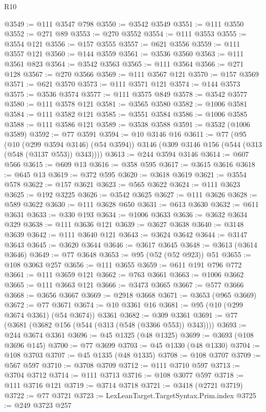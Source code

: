 \begin{lexlean}{R10}
\begin{coremodule}
{{{{{{{{{{{{{{{{{{{{{{{{{{{{{{{{{{{{{{{{{{{{{{{{{{{{{{{{{{{{{{{{{{{{{{{{{{{{{{{{{{{{{{{{{{{{{{{{{{{{{{{{{{{{@3549 := @111 @3547 @798
@3550 := @3542 @3549
@3551 := @111 @3550
@3552 := @271 @89
@3553 := @270 @3552
@3554 := @111 @3553
@3555 := @3554 @121
@3556 := @157 @3555
@3557 := @621 @3556
@3559 := @111 @3557 @121
@3560 := @144 @3559
@3561 := @3536 @3560
@3563 := @111 @3561 @823
@3564 := @3542 @3563
@3565 := @111 @3564
@3566 := @271 @128
@3567 := @270 @3566
@3569 := @111 @3567 @121
@3570 := @157 @3569
@3571 := @621 @3570
@3573 := @111 @3571 @121
@3574 := @144 @3573
@3575 := @3536 @3574
@3577 := @111 @3575 @849
@3578 := @3542 @3577
@3580 := @111 @3578 @121
@3581 := @3565 @3580
@3582 := @1006 @3581
@3584 := @111 @3582 @121
@3585 := @3551 @3584
@3586 := @1006 @3585
@3588 := @111 @3586 @121
@3589 := @3538 @3588
@3591 := @3532 (@1006 @3589)
@3592 := @77 @3591
@3594 := @10 @3146 @16
@3611 := @77
    (@95
      (@10 (@299 @3594 @3146) (@54 @3594))
      @3146
      (@309 @3146 @156 (@544 (@313 (@548 (@3137 @553)) @343))))
@3613 := @244 @3594 @3146
@3614 := @607 @566
@3615 := @609 @13
@3616 := @358 @595
@3617 := @3615 @3616
@3618 := @645 @13
@3619 := @372 @595
@3620 := @3618 @3619
@3621 := @3554 @578
@3622 := @157 @3621
@3623 := @565 @3622
@3624 := @111 @3623
@3625 := @192 @3225
@3626 := @3542 @3625
@3627 := @111 @3626
@3628 := @589 @3622
@3630 := @111 @3628 @650
@3631 := @613 @3630
@3632 := @611 @3631
@3633 := @330 @193
@3634 := @1006 @3633
@3636 := @3632 @3634 @329
@3638 := @111 @3636 @121
@3639 := @3627 @3638
@3640 := @3148 @3639
@3642 := @111 @3640 @121
@3643 := @3624 @3642
@3644 := @3147 @3643
@3645 := @3620 @3644
@3646 := @3617 @3645
@3648 := @3613 (@3614 @3646)
@3649 := @77 @3648
@3653 := @95 (@52 (@52 @923)) @51
@3655 := @108 @3063 @257
@3656 := @111 @3655
@3659 := @611 @191 @796 @772
@3661 := @111 @3659 @121
@3662 := @763 @3661
@3663 := @1006 @3662
@3665 := @111 @3663 @121
@3666 := @3473 @3665
@3667 := @577 @3666
@3668 := @3656 @3667
@3669 := @2918 @3668
@3671 := @3653 (@965 @3669)
@3672 := @77 @3671
@3674 := @10 @3361 @16
@3681 := @95 (@10 (@299 @3674 @3361) (@54 @3674)) @3361
@3682 := @309 @3361
@3691 := @77 (@3681 (@3682 @156 (@544 (@313 (@548 (@3366 @553)) @343))))
@3693 := @244 @3674 @3361
@3696 := @45 @1325 (@48 @1325)
@3699 := @3693 (@108 @3696 @145)
@3700 := @77 @3699
@3703 := @45 @1330 (@48 @1330)
@3704 := @108 @3703
@3707 := @45 @1335 (@48 @1335)
@3708 := @108 @3707
@3709 := @567 @597
@3710 := @3708 @3709
@3712 := @111 @3710 @597
@3713 := @3704 @3712
@3714 := @111 @3713
@3716 := @108 @3077 @597
@3718 := @111 @3716 @121
@3719 := @3714 @3718
@3721 := @3418 (@2721 @3719)
@3722 := @77 @3721
@3723 := LexLeanTarget.TargetSyntax.Prim.index
@3725 := @249 @3723 @257
}}}}}}}}}}}}}}}}}}}}}}}}}}}}}}}}}}}}}}}}}}}}}}}}}}}}}}}}}}}}}}}}}}}}}}}}}}}}}}}}}}}}}}}}}}}}}}}}}}}}}}}}}}}}
\end{coremodule}
\end{lexlean}
